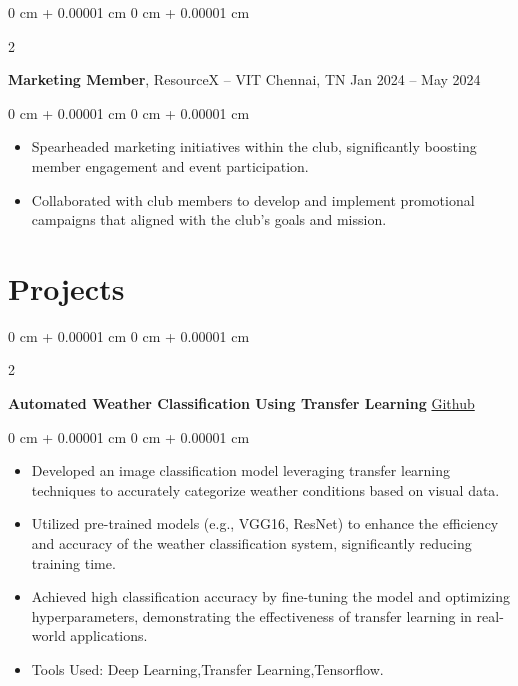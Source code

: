 \documentclass[10pt, letterpaper]{article}
\newenvironment{highlights}{
    \begin{itemize}[
        topsep=0.10 cm,
        parsep=0.10 cm,
        partopsep=0pt,
        itemsep=0pt,
        leftmargin=0 cm + 10pt
    ]
}{
    \end{itemize}
} %
\newenvironment{onecolentry}{
    \begin{adjustwidth}{
        0 cm + 0.00001 cm
    }{
        0 cm + 0.00001 cm
    }
}{
    \end{adjustwidth}
} %
\newenvironment{twocolentry}[2][]{
    \onecolentry
    \def\secondColumn{#2}
    \setcolumnwidth{\fill, 4.5 cm}
    \begin{paracol}{2}
}{
    \switchcolumn \raggedleft \secondColumn
    \end{paracol}
    \endonecolentry
} %
\begin{document}
        \vspace{0.2 cm}

        \begin{twocolentry}{
            Jan 2024 – May 2024
        }
            \textbf{Marketing Member}, ResourceX -- VIT Chennai, TN\end{twocolentry}

        \vspace{0.10 cm}
         \vspace{0.10 cm}
        \begin{onecolentry}
            \begin{highlights}
                \item Spearheaded marketing initiatives within the club, significantly boosting member engagement and event participation.
                \item Collaborated with club members to develop and implement promotional campaigns that aligned with the club’s goals and mission.
            \end{highlights}
        \end{onecolentry}
        
    \section{Projects}        
        \begin{twocolentry}{
            \href{https://github.com/Itsmepranay/Automated-Weather-Classification-Using-Transfer-Learning}{Github}
        }
            \textbf{Automated Weather Classification Using Transfer Learning}\end{twocolentry}

        \vspace{0.10 cm}
        \begin{onecolentry}
            \begin{highlights}
                \item Developed an image classification model leveraging transfer learning techniques to accurately categorize weather conditions based on visual data.
                \item Utilized pre-trained models (e.g., VGG16, ResNet) to enhance the efficiency and accuracy of the weather classification system, significantly reducing training time.
                \item Achieved high classification accuracy by fine-tuning the model and optimizing hyperparameters, demonstrating the effectiveness of transfer learning in real-world applications.
                \item Tools Used: Deep Learning,Transfer Learning,Tensorflow.
            \end{highlights}
        \end{onecolentry}
\end{document}

